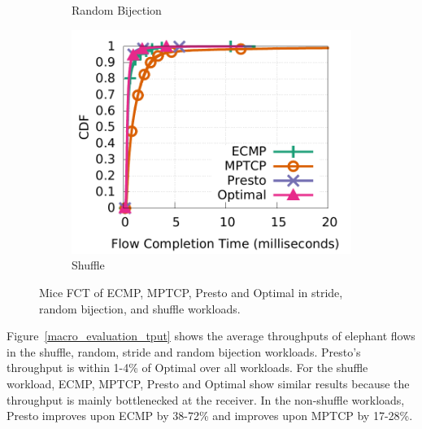 \begin{figure}[!t]
\begin{subfigure}[b]{0.3\textwidth}
        	\caption{Random Bijection}
        	\label{macro_evaluation_fct_bijection}
	\end{subfigure}
        \begin{subfigure}[b]{0.3\textwidth}
                \centering
		\includegraphics[width=\textwidth]{presto/figures/macro/shuffle/macro_compare_fct_shuffle_mice.pdf}
        	\caption{Shuffle}
        	\label{macro_evaluation_fct_shuffle}
	\end{subfigure}
	\caption{Mice FCT of ECMP, MPTCP, Presto and Optimal in stride, random bijection, and shuffle workloads.}
	\label{macro_evaluation_fct}
\end{figure}

Figure~\ref{macro_evaluation_tput} 
shows the average throughputs of elephant flows in the shuffle, random, stride and random bijection workloads.
Presto's throughput is within 1-4\% of Optimal over all workloads.
For the shuffle workload, ECMP, MPTCP, Presto and Optimal show similar results 
because the throughput is mainly bottlenecked at the receiver. 
In the non-shuffle workloads, Presto improves upon ECMP by 38-72\% and improves
upon MPTCP by 17-28\%.

